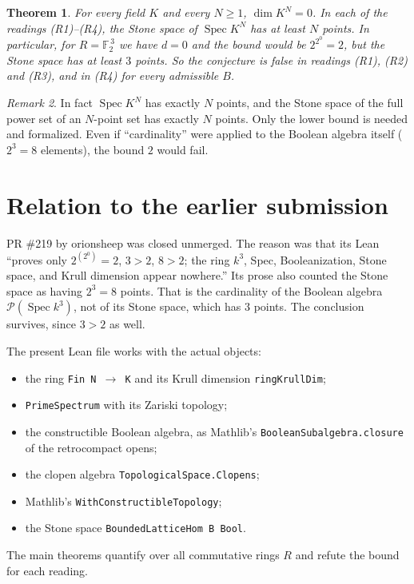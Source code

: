\documentclass[11pt]{article}
\renewcommand{\_}{\oldus\allowbreak}
\newtheorem{theorem}{Theorem}
\theoremstyle{definition}
\theoremstyle{remark}
\newtheorem{remark}[theorem]{Remark}
\begin{document}
\begin{theorem}
For every field $K$ and every $N\ge1$, $\dim K^N=0$. In each of the readings (R1)--(R4), the Stone space
of $\operatorname{Spec}K^N$ has at least $N$ points. In particular, for $R=\mathbb F_2^{\,3}$ we have
$d=0$ and the bound would be $2^{2^0}=2$, but the Stone space has at least $3$ points. So the conjecture is
false in readings (R1), (R2) and (R3), and in (R4) for every admissible $B$.
\end{theorem}

\begin{remark}
In fact $\operatorname{Spec}K^N$ has exactly $N$ points, and the Stone space of the full power set of an
$N$-point set has exactly $N$ points. Only the lower bound is needed and formalized. Even if ``cardinality''
were applied to the Boolean algebra itself ($2^3=8$ elements), the bound $2$ would fail.
\end{remark}

\section{Relation to the earlier submission}
PR \#219 by orionsheep was closed unmerged. The reason was that its Lean ``proves only $2^{(2^0)} = 2$,
$3 > 2$, $8 > 2$; the ring $k^3$, Spec, Booleanization, Stone space, and Krull dimension appear nowhere.''
Its prose also counted the Stone space as having $2^3=8$ points. That is the cardinality of the Boolean
algebra $\mathcal P(\operatorname{Spec}k^3)$, not of its Stone space, which has $3$ points. The
conclusion survives, since $3>2$ as well.

The present Lean file works with the actual objects:
\begin{itemize}
\item the ring \texttt{Fin N $\to$ K} and its Krull dimension \texttt{ringKrullDim};
\item \texttt{PrimeSpectrum} with its Zariski topology;
\item the constructible Boolean algebra, as Mathlib's \texttt{BooleanSubalgebra.closure} of the
retrocompact opens;
\item the clopen algebra \texttt{TopologicalSpace.Clopens};
\item Mathlib's \texttt{WithConstructibleTopology};
\item the Stone space \texttt{BoundedLatticeHom B Bool}.
\end{itemize}
The main theorems quantify over all commutative rings $R$ and refute the bound for each reading.
\end{document}
